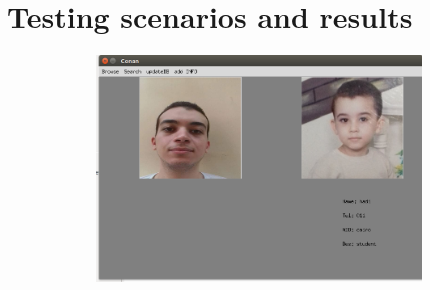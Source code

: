 \documentclass[pdftex,10pt,a4paper,oneside]{article}
\begin{document}
	\section{Testing scenarios and results}
	\begin{figure}[H]
		\centering
		\includegraphics[width=120mm,height=60mm]{fig/17.png}
	\end{figure}
	
\end{document}
